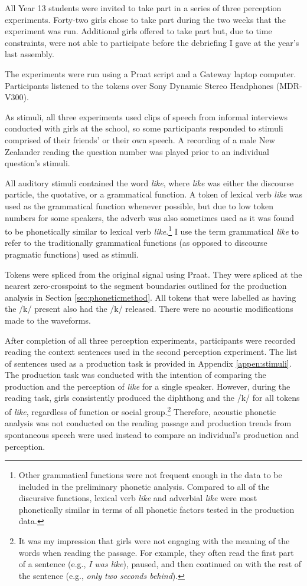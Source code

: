 All Year 13 students were invited to take part in a series of three perception experiments.  Forty-two girls chose to take part during the two weeks that the experiment was run.  Additional girls offered to take part but, due to time constraints, were not able to participate before the debriefing I gave at the year's last assembly.  

The experiments were run using a Praat script and a Gateway laptop computer.  Participants listened to the tokens over Sony Dynamic Stereo Headphones (MDR-V300).

As stimuli, all three experiments used clips of speech from informal interviews conducted with girls at the school, so some participants responded to stimuli comprised of their friends' or their own speech.    A recording of a male New Zealander reading the question number was played prior to an individual question's stimuli.

All auditory stimuli contained the word \textit{like}, where \textit{like} was either the discourse particle, the quotative, or a grammatical function.  A token of lexical verb \textit{like} was used as the grammatical function whenever possible, but due to low token numbers for some speakers, the adverb was also sometimes used as it was found to be phonetically similar to lexical verb \textit{like}.\footnote{Other grammatical functions were not frequent enough in the data to be included in the preliminary phonetic analysis.  Compared to all of the discursive functions, lexical verb \textit{like} and adverbial \textit{like} were most phonetically similar in terms of all phonetic factors tested in the production data.}  I use the term grammatical \textit{like} to refer to the traditionally grammatical functions (as opposed to discourse pragmatic functions) used as stimuli. 

Tokens were spliced from the original signal using Praat.  They were spliced at the nearest zero-crosspoint to the segment boundaries outlined for the production analysis in Section \ref{sec:phoneticmethod}.  All tokens that were labelled as having the /k/ present also had the /k/ released.  There were no acoustic modifications made to the waveforms. 

After completion of all three perception experiments, participants were recorded reading the context sentences used in the second perception experiment.  The list of sentences used as a production task is provided in Appendix \ref{appen:stimuli}.  The production task was conducted with the intention of comparing the production and the perception of \textit{like} for a single speaker.  However, during the reading task, girls consistently produced the diphthong and the /k/ for all tokens of \textit{like}, regardless of function or social group.\footnote{It was my impression that girls were not engaging with the meaning of the words when reading the passage.  For example, they often read the first part of a sentence (e.g., \textit{I was like}), paused, and then continued on with the rest of the sentence (e.g., \textit{only two seconds behind}).}  Therefore, acoustic phonetic analysis was not conducted on the reading passage and production trends from spontaneous speech were used instead to compare an individual's production and perception.  

